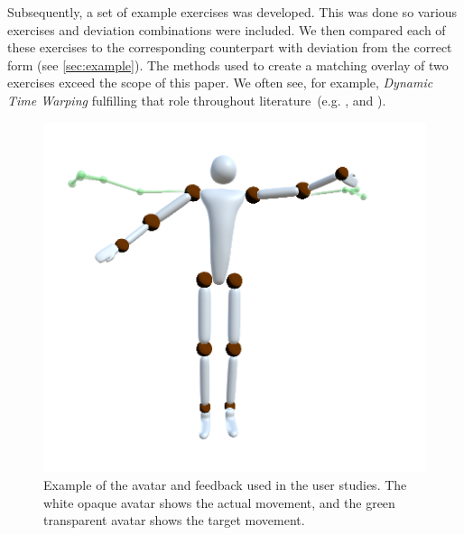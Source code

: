 Subsequently, a set of example exercises was developed. This was done so various exercises and deviation combinations were included. We then compared each of these exercises to the corresponding counterpart with deviation from the correct form (see \autoref{sec:example}). The methods used to create a matching overlay of two exercises exceed the scope of this paper. We often see, for example, \emph{Dynamic Time Warping} fulfilling that role throughout literature~(e.g. \cite{su2013pre}, \cite{anton2015pre} and \cite{saenz2016kbv}).

\begin{figure}[b]
	\centering
	\includegraphics[width=\linewidth]{pictures/avatar.png}
	\caption{Example of the avatar and feedback used in the user studies. The white opaque avatar shows the actual movement, and the green transparent avatar shows the target movement.}
	\label{fig:avatar}
\end{figure}

